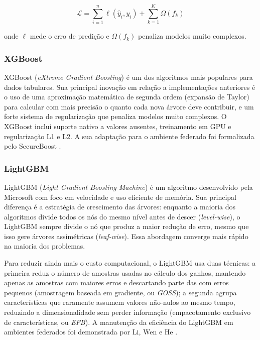 \begin{equation}
\mathcal{L} = \sum_{i=1}^{n} \ell(\hat{y}_i, y_i) + \sum_{k=1}^{K} \Omega(f_k)
\end{equation}

onde $\ell$ mede o erro de predição e $\Omega(f_k)$ penaliza modelos muito complexos.


\subsubsection{XGBoost}

XGBoost (\textit{eXtreme Gradient Boosting}) \cite{chen2016xgboost} é um dos algoritmos mais populares para dados tabulares. Sua principal inovação em relação a implementações anteriores é o uso de uma aproximação matemática de segunda ordem (expansão de Taylor) para calcular com mais precisão o quanto cada nova árvore deve contribuir, e um forte sistema de regularização que penaliza modelos muito complexos. O XGBoost inclui suporte nativo a valores ausentes, treinamento em GPU e regularização L1 e L2. A sua adaptação para o ambiente federado foi formalizada pelo SecureBoost \cite{cheng2021secureboost}.


\subsubsection{LightGBM}

LightGBM (\textit{Light Gradient Boosting Machine}) \cite{ke2017lightgbm} é um algoritmo desenvolvido pela Microsoft com foco em velocidade e uso eficiente de memória. Sua principal diferença é a estratégia de crescimento das árvores: enquanto a maioria dos algoritmos divide todos os nós do mesmo nível antes de descer (\textit{level-wise}), o LightGBM sempre divide o nó que produz a maior redução de erro, mesmo que isso gere árvores assimétricas (\textit{leaf-wise}). Essa abordagem converge mais rápido na maioria dos problemas.

Para reduzir ainda mais o custo computacional, o LightGBM usa duas técnicas: a primeira reduz o número de amostras usadas no cálculo dos ganhos, mantendo apenas as amostras com maiores erros e descartando parte das com erros pequenos (amostragem baseada em gradiente, ou \textit{GOSS}); a segunda agrupa características que raramente assumem valores não-nulos ao mesmo tempo, reduzindo a dimensionalidade sem perder informação (empacotamento exclusivo de características, ou \textit{EFB}). A manutenção da eficiência do LightGBM em ambientes federados foi demonstrada por Li, Wen e He \cite{li2020practical}.



